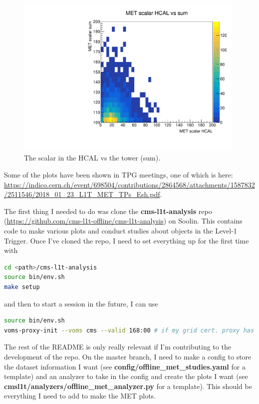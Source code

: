 \begin{figure}[htbp]
\centering
\includegraphics[width=110mm]{figures/MET_studies_v6/Plots/MetScalHcaltotal.pdf}
\caption{The \etmiss scalar in the HCAL vs the tower (sum).}
\end{figure}

Some of the plots have been shown in TPG meetings, one of which is here: \url{https://indico.cern.ch/event/698504/contributions/2864568/attachments/1587832/2511546/2018_01_23_L1T_MET_TPs_Esh.pdf}.



\if
The first thing I needed to do was clone the \textbf{cms-l1t-analysis} repo (\url{https://github.com/cms-l1t-offline/cms-l1t-analysis}) on Soolin. This contains code to make various plots and conduct studies about objects in the Level-1 Trigger. Once I've cloned the repo, I need to set everything up for the first time with

\begin{lstlisting}[belowskip=-0.7cm, language=sh, numbers=none]
cd <path>/cms-l1t-analysis
source bin/env.sh
make setup
\end{lstlisting}

and then to start a session in the future, I can use

\begin{lstlisting}[belowskip=-0.7cm, language=sh, numbers=none]
source bin/env.sh
voms-proxy-init --voms cms --valid 168:00 # if my grid cert. proxy has expired
\end{lstlisting}

The rest of the README is only really relevant if I'm contributing to the development of the repo. On the master branch, I need to make a config to store the dataset information I want (see \textbf{config/offline\_met\_studies.yaml} for a template) and an analyzer to take in the config and create the plots I want (see \textbf{cmsl1t/analyzers/offline\_met\_analyzer.py} for a template). This should be everything I need to add to make the MET plots.

